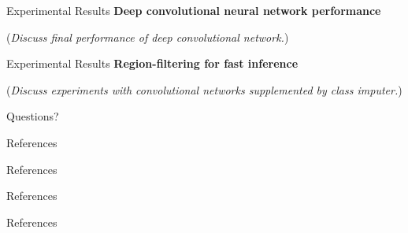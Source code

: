 \documentclass[10pt]{beamer}
\begin{document}
\begin{frame}{Experimental Results}
\textbf{Deep convolutional neural network performance}

(\emph{Discuss final performance of deep convolutional network.})
\end{frame}

\begin{frame}{Experimental Results}
\textbf{Region-filtering for fast inference}

(\emph{Discuss experiments with convolutional networks supplemented by class imputer.})
\end{frame}


\begin{frame}[standout]
  Questions?
\end{frame}


\begin{frame}{References}
\cite{kingma2014semisupervised}

\cite{prince2012computer}

\cite{goodfellow2016deep}

\end{frame}

\begin{frame}{References}
\cite{ioffe2015batch}

\cite{bengio2012representation}

\cite{jaderberg2015spatial}
\end{frame}

\begin{frame}{References}
\cite{iofee2015batch}

\cite{bengio2012representation}

\cite{jaderberg2015spatial}
\end{frame}

\begin{frame}{References}
\cite{szegedy2014deeper}
\end{frame}

\appendix
\end{document}
